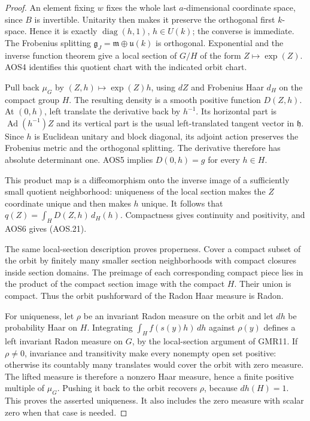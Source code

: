 \documentclass[11pt,a4paper]{article}
\numberwithin{equation}{section}
\theoremstyle{remark}\newtheorem{remark}[theorem]{Remark}
\begin{document}
\begin{proof}
An element fixing $w$ fixes the whole last $a$-dimensional coordinate
space, since $B$ is invertible.  Unitarity then makes it preserve
the orthogonal first $k$-space.  Hence it is exactly
$\operatorname{diag}(h,1)$, $h\in U(k)$; the converse is immediate.
The Frobenius splitting
$\mathfrak g_J=\mathfrak m\oplus\mathfrak u(k)$ is orthogonal.
Exponential and the inverse function theorem give a local section of
$G/H$ of the form $Z\mapsto\exp(Z)$.  AOS4 identifies this quotient
chart with the indicated orbit chart.

Pull back $\mu_G$ by $(Z,h)\mapsto\exp(Z)h$, using $dZ$ and
Frobenius Haar $d_H$ on the compact group $H$.  The resulting density
is a smooth positive function $D(Z,h)$.  At $(0,h)$, left translate
the derivative back by $h^{-1}$.  Its horizontal part is
$\operatorname{Ad}(h^{-1})Z$ and its vertical part is the usual
left-translated tangent vector in $\mathfrak h$.  Since $h$ is
Euclidean unitary and block diagonal, its adjoint action preserves
the Frobenius metric and the orthogonal splitting.  The derivative
therefore has absolute determinant one.  AOS5 implies
$D(0,h)=g$ for every $h\in H$.

This product map is a diffeomorphism onto the inverse image of a
sufficiently small quotient neighborhood: uniqueness of the local
section makes the $Z$ coordinate unique and then makes $h$ unique.
It follows that $q(Z)=\int_H D(Z,h)\,d_H(h)$.  Compactness gives
continuity and positivity, and AOS6 gives (AOS.21).

The same local-section description proves properness.  Cover a
compact subset of the orbit by finitely many smaller section
neighborhoods with compact closures inside section domains.  The
preimage of each corresponding compact piece lies in the product
of the compact section image with the compact $H$.  Their union is
compact.  Thus the orbit pushforward of the Radon Haar measure is
Radon.

For uniqueness, let $\rho$ be an invariant Radon measure on the
orbit and let $dh$ be probability Haar on $H$.  Integrating
$\int_H f(s(y)h)\,dh$ against $\rho(y)$ defines a left invariant
Radon measure on $G$, by the local-section argument of GMR11.
If $\rho\ne0$, invariance and transitivity make every nonempty open
set positive: otherwise its countably many translates would cover
the orbit with zero measure.  The lifted measure is therefore a
nonzero Haar measure, hence a finite positive multiple of $\mu_G$.
Pushing it back to the orbit recovers $\rho$, because $dh(H)=1$.
This proves the asserted uniqueness.  It also includes the zero
measure with scalar zero when that case is needed.
\end{proof}
\end{document}
